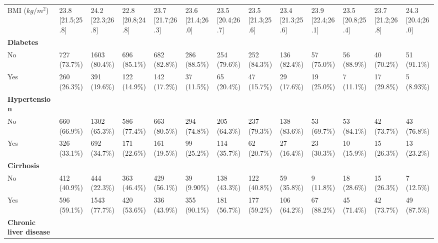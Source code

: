 \documentclass{article}
\begin{document}
\begin{landscape}
\begin{tiny}
\begin{tabularx}{\linewidth}{p{2.0cm}|X|X|X|X|X|X|X|X|X|X|X|X}
\rowcolor{gray!10}
BMI ($kg/m^2$) & 23.8 [21.5;25.8] & 24.2 [22.3;26.8] & 22.8 [20.8;24.8] & 23.7 [21.7;26.3] & 23.6 [21.4;26.0] & 23.5 [20.4;26.7] & 23.5 [21.3;25.6] & 23.4 [21.3;25.6] & 23.9 [22.4;26.1] & 23.5 [20.8;25.4] & 23.7 [21.2;26.8] & 24.3 [20.4;26.0] \\
\rowcolor{gray!30}
\textbf{Diabetes}  &  &  &  &  &  &  &  &  &  &  &  &  \\
\rowcolor{gray!10}
    No &   727 (73.7\%)    &   1603 (80.4\%)   &   696 (85.1\%)    &   682 (82.8\%)    &   286 (88.5\%)    &   254 (79.6\%)    &   252 (84.3\%)    &   136 (82.4\%)    &    57 (75.0\%)    &    56 (88.9\%)    &    40 (70.2\%)    &    51 (91.1\%)    \\
\rowcolor{gray!10}
    Yes &   260 (26.3\%)    &   391 (19.6\%)    &   122 (14.9\%)    &   142 (17.2\%)    &    37 (11.5\%)    &    65 (20.4\%)    &    47 (15.7\%)    &    29 (17.6\%)    &    19 (25.0\%)    &    7 (11.1\%)     &    17 (29.8\%)    &    5 (8.93\%)     \\
\rowcolor{gray!30}
\textbf{Hypertension }  &  &  &  &  &  &  &  &  &  &  &  &  \\
\rowcolor{gray!10}
    No &   660 (66.9\%)    &   1302 (65.3\%)   &   586 (77.4\%)    &   663 (80.5\%)    &   294 (74.8\%)    &   205 (64.3\%)    &   237 (79.3\%)    &   138 (83.6\%)    &    53 (69.7\%)    &    53 (84.1\%)    &    42 (73.7\%)    &    43 (76.8\%)    \\
\rowcolor{gray!10}
    Yes &   326 (33.1\%)    &   692 (34.7\%)    &   171 (22.6\%)    &   161 (19.5\%)    &    99 (25.2\%)    &   114 (35.7\%)    &    62 (20.7\%)    &    27 (16.4\%)    &    23 (30.3\%)    &    10 (15.9\%)    &    15 (26.3\%)    &    13 (23.2\%)    \\
\rowcolor{gray!30}
\textbf{Cirrhosis }  &  &  &  &  &  &  &  &  &  &  &  &  \\
\rowcolor{gray!10}
    No &   412 (40.9\%)    &   444 (22.3\%)    &   363 (46.4\%)    &   429 (56.1\%)    &    39 (9.90\%)    &   138 (43.3\%)    &   122 (40.8\%)    &    59 (35.8\%)    &    9 (11.8\%)     &    18 (28.6\%)    &    15 (26.3\%)    &    7 (12.5\%)     \\
\rowcolor{gray!10}
    Yes &   596 (59.1\%)    &   1543 (77.7\%)   &   420 (53.6\%)    &   336 (43.9\%)    &   355 (90.1\%)    &   181 (56.7\%)    &   177 (59.2\%)    &   106 (64.2\%)    &    67 (88.2\%)    &    45 (71.4\%)    &    42 (73.7\%)    &    49 (87.5\%)    \\
\rowcolor{gray!30}
\textbf{Chronic liver disease }  &  &  &  &  &  &  &  &  &  &  &  &  \\

\end{tabularx}
\end{tiny}
\end{landscape}
\end{document}
